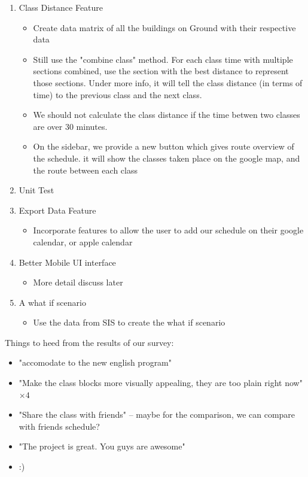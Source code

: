 \documentclass[letterpaper,11pt]{article}
\begin{document}
\begin{enumerate}
    \item Class Distance Feature
    \begin{itemize}
        \item Create data matrix of all the buildings on Ground with their respective data
        \item Still use the "combine class" method. For each class time with
        multiple sections combined, use the section with the best distance 
        to represent those sections. Under more info, it will tell the class distance
        (in terms of time) to the previous class and the next class. 
        \item We should not calculate the class distance if the time betwen two classes are over 30 minutes.
        \item On the sidebar, we provide a new button which gives route overview of the schedule. 
        it will show the classes taken place on the google map, and the route between each class
    \end{itemize}

    \item Unit Test

    \item Export Data Feature
    \begin{itemize}
        \item Incorporate features to allow the user to add our schedule on their
        google calendar, or apple calendar
    \end{itemize}

    \item Better Mobile UI interface
    \begin{itemize}
        \item More detail discuss later
    \end{itemize}

    \item A what if scenario
    \begin{itemize}
        \item Use the data from SIS to create the what if scenario
    \end{itemize}
    
\end{enumerate}

Things to heed from the results of our survey:
\begin{itemize}
    \item "accomodate to the new english program"
    \item "Make the class blocks more visually appealing, they are too plain right now" \(\times4\)
    \item "Share the class with friends" -- maybe for the comparison, we can compare with friends schedule?
    \item "The project is great. You guys are awesome"
    \item :)
\end{itemize}
\end{document}
